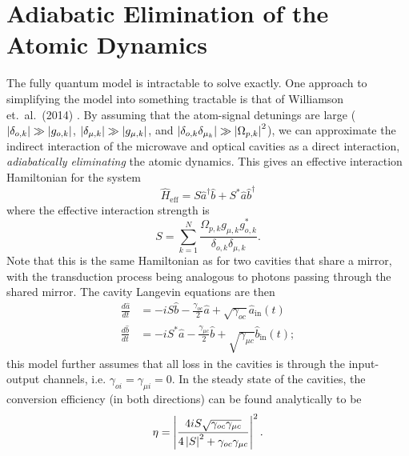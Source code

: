 \section{\label{sec:adiabatic_elimination}Adiabatic Elimination of the Atomic Dynamics}
\noindent The fully quantum model is intractable to solve exactly. One approach to simplifying the model into something tractable is that of Williamson et.\ al.\ (2014) \cite{williamson_2014}. By assuming that the atom-signal detunings are large ($\left|\delta_{o,k}\right| \gg \left|g_{o,k}\right|$, $\left|\delta_{\mu,k}\right| \gg \left|g_{\mu,k}\right|$, and $\left|\delta_{o,k}\delta_{\mu_k}\right| \gg \left|\Omega_{p,k}\right|^2$), we can approximate the indirect interaction of the microwave and optical cavities as a direct interaction, \textit{adiabatically eliminating}\cite{brion_2007} the atomic dynamics. This gives an effective interaction Hamiltonian for the system
\begin{equation}
    \hat{H}_\text{eff} = S\hat{a}^\dagger\hat{b} + S^*\hat{a}\hat{b}^\dagger
\end{equation}
where the effective interaction strength is
\begin{equation}
    S = \sum_{k=1}^{N} \frac{\Omega_{p,k}g_{\mu,k}g_{o,k}^*}{\delta_{o,k}\delta_{\mu,k}}.
\end{equation}
Note that this is the same Hamiltonian as for two cavities that share a mirror, with the transduction process being analogous to photons passing through the shared mirror. The cavity Langevin equations are then
\begin{align}
    \frac{d\hat{a}}{dt} &= -iS\hat{b} - \frac{\gamma_{oc}}{2}\hat{a} + \sqrt{\gamma_{oc}}\hat{a}_\text{in}(t)\\
    \frac{d\hat{b}}{dt} &= -iS^*\hat{a} - \frac{\gamma_{\mu c}}{2}\hat{b} + \sqrt{\gamma_{\mu c}}\hat{b}_\text{in}(t);
\end{align}
this model further assumes that all loss in the cavities is through the input-output channels, i.e. $\gamma_{oi} = \gamma_{\mu i} = 0$. In the steady state of the cavities, the conversion efficiency (in both directions) can be found analytically to be
\begin{equation}
    \eta = \left|\frac{4iS\sqrt{\gamma_{oc}\gamma_{\mu c}}}{4\left|S\right|^2+\gamma_{oc}\gamma_{\mu c}}\right|^2.
\end{equation}

